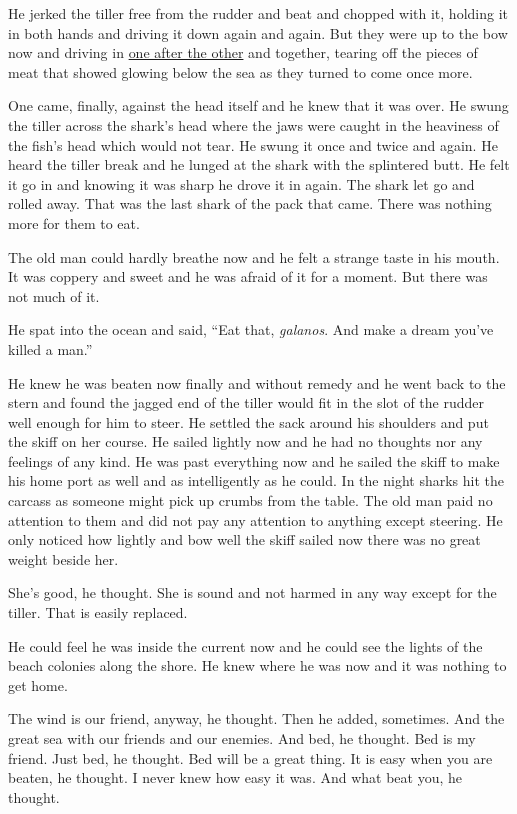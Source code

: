 \documentclass[fontset=ubuntu]{ctexrep}
\begin{document}
He jerked the tiller free from the rudder and beat and chopped with it,
holding it in both hands and driving it down again and again. But they were
up to the bow now and driving in \uline{one after the other} and together,
\gls{tearing} off the pieces of meat that showed glowing below the sea as they
turned to come once more.

One came, finally, against the head itself and he knew that it was over. He
swung the tiller across the shark's head where the jaws were caught in the
heaviness of the fish's head which would not \gls{tear}. He swung it once and
twice and again. He heard the tiller break and he \gls{lunged} at the shark
with the \gls{splintered} butt. He felt it go in and knowing it was sharp he
drove it in again. The shark let go and rolled away. That was the last shark
of the \gls{pack} that came. There was nothing more for them to eat.

The old man could hardly breathe now and he felt a strange taste in his
mouth. It was \gls{coppery} and sweet and he was afraid of it for a moment.
But there was not much of it.

He \gls{spat} into the ocean and said, ``Eat that, \emph{galanos}. And make a dream
you've killed a man.''

He knew he was beaten now finally and without \gls{remedy} and he went back
to the stern and found the \gls{jagged} end of the tiller would \gls{fit} in
the slot of the \gls{rudder} well enough for him to steer. He settled the
sack around his shoulders and put the skiff on her course. He sailed lightly
now and he had no thoughts nor any feelings of any kind. He was past
everything now and he sailed the skiff to make his home port as well and as
intelligently as he could. In the night sharks hit the carcass as someone
might pick up \glspl{crumb} from the table. The old man paid no attention to
them and did not pay any attention to anything except steering. He only
noticed how lightly and bow well the skiff sailed now there was no great
weight beside her.

She's good, he thought. She is sound and not harmed in any way except for
the tiller. That is easily replaced.

He could feel he was inside the current now and he could see the lights of
the beach \gls{colonies} along the shore. He knew where he was now and it
was nothing to get home.

The wind is our friend, anyway, he thought. Then he \gls{added},
sometimes. And the great sea with our friends and our enemies. And bed, he
thought. Bed is my friend. Just bed, he thought. Bed will be a great thing.
It is easy when you are beaten, he thought. I never knew how easy it was.
And what beat you, he thought.
\end{document}
